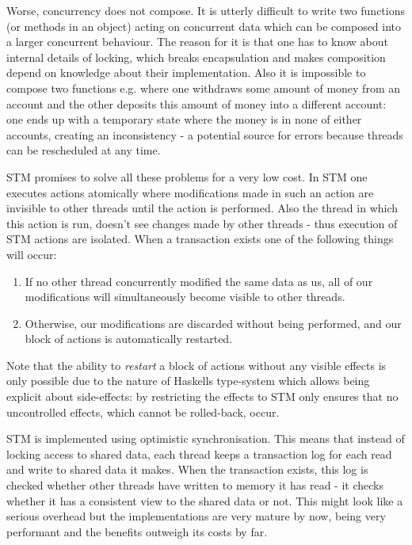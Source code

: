Worse, concurrency does not compose. It is utterly difficult to write two functions (or methods in an object) acting on concurrent data which can be composed into a larger concurrent behaviour. The reason for it is that one has to know about internal details of locking, which breaks encapsulation and makes composition depend on knowledge about their implementation. Also it is impossible to compose two functions e.g. where one withdraws some amount of money from an account and the other deposits this amount of money into a different account: one ends up with a temporary state where the money is in none of either accounts, creating an inconsistency - a potential source for errors because threads can be rescheduled at any time.

STM promises to solve all these problems for a very low cost. In STM one executes actions atomically where modifications made in such an action are invisible to other threads until the action is performed. Also the thread in which this action is run, doesn't see changes made by other threads - thus execution of STM actions are isolated. When a transaction exists one of the following things will occur:

\begin{enumerate}
	\item If no other thread concurrently modified the same data as us, all of our modifications will simultaneously become visible to other threads.
	\item Otherwise, our modifications are discarded without being performed, and our block of actions is automatically restarted.
\end{enumerate}

Note that the ability to \textit{restart} a block of actions without any visible effects is only possible due to the nature of Haskells type-system which allows being explicit about side-effects: by restricting the effects to STM only ensures that no uncontrolled effects, which cannot be rolled-back, occur.

STM is implemented using optimistic synchronisation. This means that instead of locking access to shared data, each thread keeps a transaction log for each read and write to shared data it makes. When the transaction exists, this log is checked whether other threads have written to memory it has read - it checks whether it has a consistent view to the shared data or not. This might look like a serious overhead but the implementations are very mature by now, being very performant and the benefits outweigh its costs by far.

